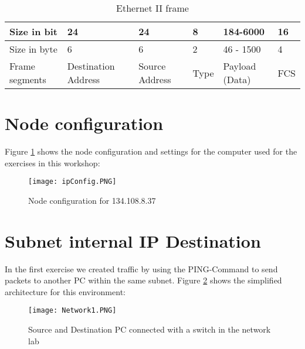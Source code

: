 \begin{table}[H]
	\centering
	\label{ethernet}
	\begin{tabular}{|l|l|l|l|l|l|}
		\hline
		Size in bit    & 24                  & 24             & 8    & 184-6000       & 16             \\ \hline
		Size in byte   & 6                   & 6              & 2    & 46 - 1500      & 4              \\ \hline
		Frame segments & Destination Address & Source Address & Type & Payload (Data) & FCS \\ \hline
	\end{tabular}
	\caption{Ethernet II frame}
\end{table}

\section{Node configuration}

Figure \ref{ip-config} shows the node configuration and settings for the computer used for the exercises in this workshop:

\begin{figure}[H]
	\centering
	\texttt{[image: ipConfig.PNG]}
	\caption{Node configuration for 134.108.8.37}
	\label{ip-config}
\end{figure}

\section{Subnet internal IP Destination}
In the first exercise we created traffic by using the PING-Command to send packets to another PC within the same subnet. Figure \ref{network-internal} shows the simplified architecture for this environment:
\begin{figure}[H]
	\centering
	\texttt{[image: Network1.PNG]}
	\caption{Source and Destination PC connected with a switch in the network lab}
	\label{network-internal}
\end{figure}


